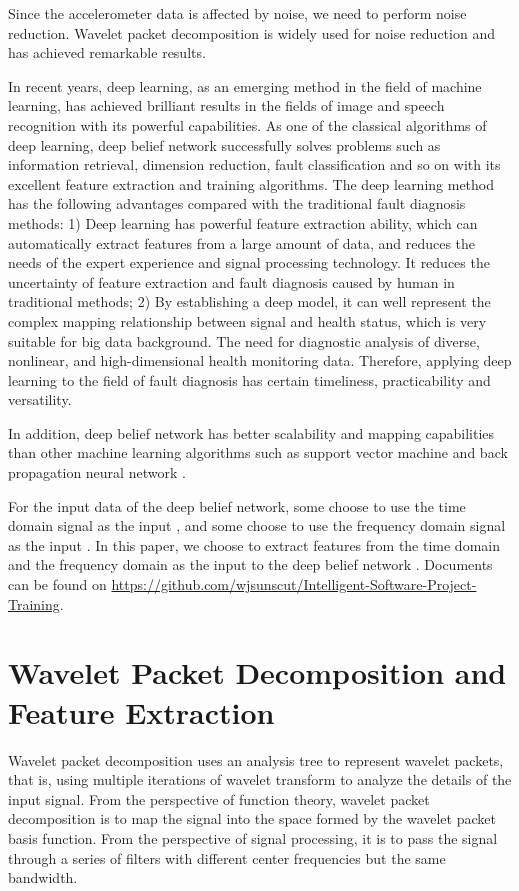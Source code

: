 \documentclass{modified}
\begin{document}
Since the accelerometer data is affected by noise, we need to perform noise reduction. Wavelet packet decomposition \cite{Wang2015Detection}\cite{Yongle2015Zero} is widely used for noise reduction and has achieved remarkable results.


In recent years, deep learning, as an emerging method in the field of machine learning, has achieved brilliant results in the fields of image and speech recognition with its powerful capabilities. As one of the classical algorithms of deep learning, deep belief network \cite{Hinton2012A} successfully solves problems such as information retrieval, dimension reduction, fault classification and so on with its excellent feature extraction and training algorithms. The deep learning method has the following advantages compared with the traditional fault diagnosis methods: 1) Deep learning has powerful feature extraction ability, which can automatically extract features from a large amount of data, and reduces the needs of the expert experience and signal processing technology. It reduces the uncertainty of feature extraction and fault diagnosis caused by human in traditional methods; 2) By establishing a deep model, it can well represent the complex mapping relationship between signal and health status, which is very suitable for big data background. The need for diagnostic analysis of diverse, nonlinear, and high-dimensional health monitoring data. Therefore, applying deep learning to the field of fault diagnosis has certain timeliness, practicability and versatility.

In addition, deep belief network has better scalability and mapping capabilities than other machine learning algorithms such as support vector machine \cite{vapnik1999overview} and back propagation neural network \cite{Kramer1990Diagnosis}.

For the input data of the deep belief network, some choose to use the time domain signal as the input \cite{guangquan2016fault}, and some choose to use the frequency domain signal as the input \cite{jia2016deep}. In this paper, we choose to extract features from the time domain and the frequency domain as the input to the deep belief network \cite{YiThe}. Documents can be found on \href{https://github.com/wjsunscut/Intelligent-Software-Project-Training}{https://github.com/wjsunscut/Intelligent-Software-Project-Training}.

\section{Wavelet Packet Decomposition and Feature Extraction}
Wavelet packet decomposition uses an analysis tree to represent wavelet packets, that is, using multiple iterations of wavelet transform to analyze the details of the input signal. From the perspective of function theory, wavelet packet decomposition is to map the signal into the space formed by the wavelet packet basis function. From the perspective of signal processing, it is to pass the signal through a series of filters with different center frequencies but the same bandwidth.
\end{document}
